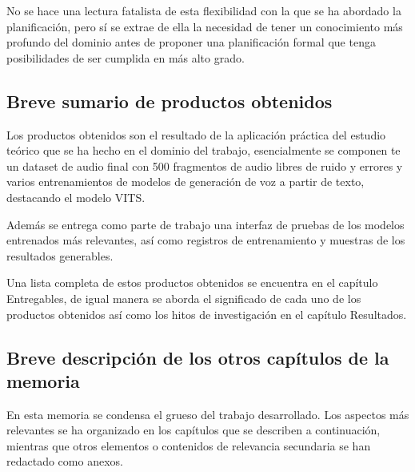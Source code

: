 No se hace una lectura fatalista de esta flexibilidad con la que se ha abordado la planificación, pero sí se extrae de ella la necesidad de tener un conocimiento más profundo del dominio antes de proponer una planificación formal que tenga posibilidades de ser cumplida en más alto grado.

\subsection{Breve sumario de productos obtenidos}


Los productos obtenidos son el resultado de la aplicación práctica del estudio teórico que se ha hecho en el dominio del trabajo, esencialmente se componen te un dataset de audio final con 500 fragmentos de audio libres de ruido y errores y varios entrenamientos de modelos de generación de voz a partir de texto, destacando el modelo VITS.

Además se entrega como parte de trabajo una interfaz de pruebas de los modelos entrenados más relevantes, así como registros de entrenamiento y muestras de los resultados generables.

Una lista completa de estos productos obtenidos se encuentra en el capítulo Entregables, de igual manera se aborda el significado de cada uno de los productos obtenidos así como los hitos de investigación en el capítulo Resultados.

\subsection{Breve descripción de los otros capítulos de la memoria}

En esta memoria se condensa el grueso del trabajo desarrollado. Los aspectos más relevantes se ha organizado en los capítulos que se describen a continuación, mientras que otros elementos o contenidos de relevancia secundaria se han redactado como anexos.

